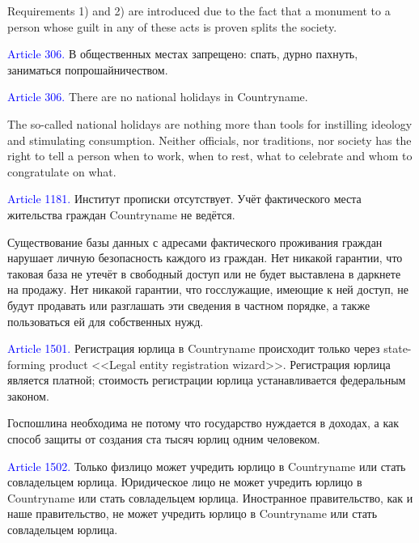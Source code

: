 \documentclass[11pt]{article}
\theoremstyle{remark}
\theoremstyle{definition}
\begin{document}
Requirements 1) and 2) are introduced due to the fact that a monument to a person whose guilt in any of these acts is proven splits the society.



\color{black}




\textcolor{blue}{Article 306.} В общественных местах запрещено: спать, дурно пахнуть, заниматься попрошайничеством. 

\textcolor{blue}{Article 306.} There are no national holidays in Countryname.

\color{blue}

The so-called national holidays are nothing more than tools for instilling ideology and stimulating consumption. Neither officials, nor traditions, nor society has the right to tell a person when to work, when to rest, what to celebrate and whom to congratulate on what.




\color{black}




\textcolor{blue}{Article 1181.} Институт прописки отсутствует. Учёт фактического места жительства граждан Countryname не ведётся.

\color{blue}


Существование базы данных с адресами фактического проживания граждан нарушает личную безопасность каждого из граждан. Нет никакой гарантии, что таковая база не утечёт в свободный доступ или не будет выставлена в даркнете на продажу. Нет никакой гарантии, что госслужащие, имеющие к ней доступ, не будут продавать или разглашать эти сведения в частном порядке, а также пользоваться ей для собственных нужд.




\color{black}


\textcolor{blue}{Article 1501.} Регистрация юрлица в Countryname происходит только через state-forming product <<Legal entity registration wizard>>. Регистрация юрлица является платной; стоимость регистрации юрлица устанавливается федеральным законом. 

\color{blue}

Госпошлина необходима не потому что государство нуждается в доходах, а как способ защиты от создания ста тысяч юрлиц одним человеком. 

\color{black}

\textcolor{blue}{Article 1502.} Только физлицо может учредить юрлицо в Countryname или стать совладельцем юрлица. Юридическое лицо не может учредить юрлицо в Countryname или стать совладельцем юрлица. Иностранное правительство, как и наше правительство, не может учредить юрлицо в Countryname или стать совладельцем юрлица.
\end{document}

